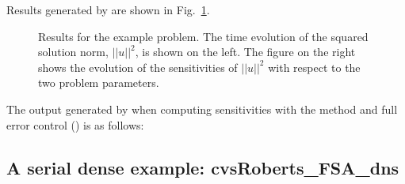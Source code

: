 Results generated by  are shown in Fig.~\ref{f:cvsAdvDiff_FSA_non}. 
\begin{figure}
  {\centerline{}}
  \caption{Results for the  example problem.
    The time evolution of the squared solution norm, $||u||^2$, is shown on the left. 
    The figure on the right shows the evolution of the sensitivities of $||u||^2$
    with respect to the two problem parameters.}
  \label{f:cvsAdvDiff_FSA_non}
\end{figure}
The output generated by  when computing
sensitivities with the  method and full error
control () is as follows:



\subsection{A serial dense example: cvsRoberts\_FSA\_dns}
\label{ss:cvsRoberts_FSA_dns}

